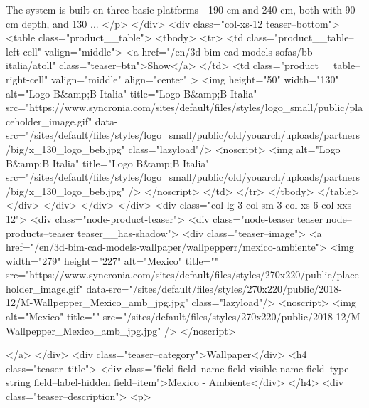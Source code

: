             The system is built on three basic platforms - 190 cm and 240 cm, both with 90 cm depth, and 130 ...
	</p>
	</div>
	<div class="col-xs-12 teaser--bottom">
		<table class="product__table">
            <tbody>
            	<tr>
                	<td class="product__table--left-cell" valign="middle"> 
                    	<a href="/en/3d-bim-cad-models-sofas/bb-italia/atoll" class="teaser--btn">Show</a>
                	</td>
               		<td class="product__table--right-cell" valign="middle" align="center" >
                    	<img  height="50" width="130" alt="Logo B&amp;B Italia" title="Logo B&amp;B Italia" src="https://www.syncronia.com/sites/default/files/styles/logo_small/public/placeholder_image.gif" data-src="/sites/default/files/styles/logo_small/public/old/youarch/uploads/partners/big/x_130_logo_beb.jpg" class="lazyload"/>
            <noscript>
                <img alt="Logo B&amp;B Italia" title="Logo B&amp;B Italia" src="/sites/default/files/styles/logo_small/public/old/youarch/uploads/partners/big/x_130_logo_beb.jpg" />
            </noscript>
					</td>
           		</tr>
            </tbody>
        </table>
	</div>
</div>
          </div>
      </div>
            <div  class="col-lg-3 col-sm-3 col-xs-6 col-xxs-12">
          <div class="node-product-teaser">
          <div class="node-teaser teaser node--products--teaser teaser__has-shadow">
	<div class="teaser--image">
		<a href="/en/3d-bim-cad-models-wallpaper/wallpepperr/mexico-ambiente">
			<img width="279" height="227" alt="Mexico" title="" src="https://www.syncronia.com/sites/default/files/styles/270x220/public/placeholder_image.gif" data-src="/sites/default/files/styles/270x220/public/2018-12/M-Wallpepper_Mexico_amb_jpg.jpg" class="lazyload"/>
            <noscript>
                <img alt="Mexico" title="" src="/sites/default/files/styles/270x220/public/2018-12/M-Wallpepper_Mexico_amb_jpg.jpg" />
            </noscript>
			
		</a> 
	</div>
	<div class="teaser--category">Wallpaper</div>
	<h4 class="teaser--title">
            <div class="field field--name-field-visible-name field--type-string field--label-hidden field--item">Mexico - Ambiente</div>
      </h4>
	<div  class="teaser--description">
	<p>
				
